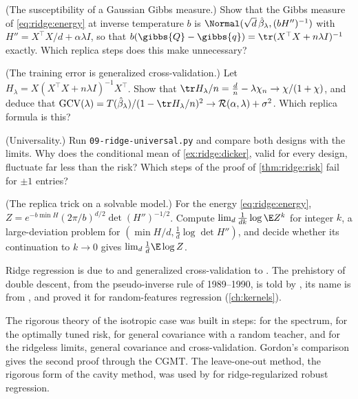 \begin{refsection}
\begin{exercises}
\item \translate (The susceptibility of a Gaussian Gibbs measure.) Show that the Gibbs measure of \eqref{eq:ridge:energy} at inverse temperature $b$ is $\Normal(\sqrt d\,\hat\beta_\lambda,(bH'')^{-1})$ with $H''=X^\top X/d+\alpha\lambda I$, so that $b(\gibbs{Q}-\gibbs{q})=\tr(X^\top X+n\lambda I)^{-1}$ exactly. Which replica steps does this make unnecessary?\label{ex:ridge:gibbs}

\item \translate (The training error is generalized cross-validation.) Let $H_\lambda=X(X^\top X+n\lambda I)^{-1}X^\top$. Show that $\tr H_\lambda/n=\frac dn-\lambda\chi_n\to\chi/(1+\chi)$, and deduce that $\mathrm{GCV}(\lambda)=T(\hat\beta_\lambda)/(1-\tr H_\lambda/n)^2\to\ridgeR(\alpha,\lambda)+\sigma^2$. Which replica formula is this?\label{ex:ridge:gcv}

\item \measurement (Universality.) Run \texttt{09-ridge-universal.py} and compare both designs with the limits. Why does the conditional mean of \cref{ex:ridge:dicker}, valid for every design, fluctuate far less than the risk? Which steps of the proof of \cref{thm:ridge:risk} fail for $\pm1$ entries?\label{ex:ridge:universal}

\item \research (The replica trick on a solvable model.) For the energy \eqref{eq:ridge:energy}, $Z=e^{-b\min H}(2\pi/b)^{d/2}\det(H'')^{-1/2}$. Compute $\lim_d\frac1{dk}\log\E Z^k$ for integer $k$, a large-deviation problem for $(\min H/d,\frac1d\log\det H'')$, and decide whether its continuation to $k\to0$ gives $\lim_d\frac1d\E\log Z$.\label{ex:ridge:replicatrick}
\end{exercises}

\notesandrefs
Ridge regression is due to \textcite{HoerlKennard1970} and generalized cross-validation to \textcite{GolubHeathWahba1979}. The prehistory of double descent, from the pseudo-inverse rule of 1989--1990, is told by \textcite{LoogEtAl2020}, its name is from \textcite{BelkinEtAl2019}, and \textcite{MeiMontanari2022} proved it for random-features regression (\cref{ch:kernels}).

The rigorous theory of the isotropic case was built in steps: \textcite{MarchenkoPastur1967} for the spectrum, \textcite{Dicker2016} for the optimally tuned risk, \textcite{DobribanWager2018} for general covariance with a random teacher, and \textcite{HastieEtAl2022} for the ridgeless limits, general covariance and cross-validation. Gordon's comparison \parencite{Gordon1988} gives the second proof through the CGMT. The leave-one-out method, the rigorous form of the cavity method, was used by \textcite{ElKaroui2013} for ridge-regularized robust regression.


\end{refsection}
